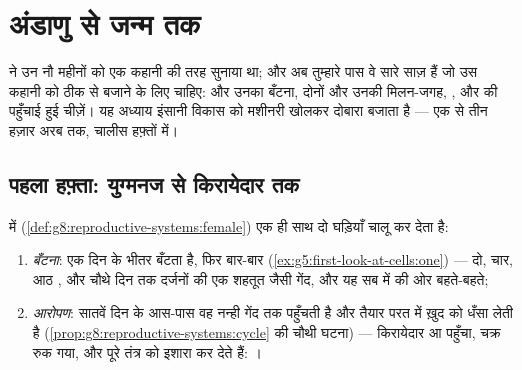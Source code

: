 \chapter{अंडाणु से जन्म तक}\label{ch:g8:from-egg-to-birth}

 ने उन नौ महीनों को एक कहानी की तरह
सुनाया था; और अब तुम्हारे पास वे सारे साज़ हैं जो उस कहानी को ठीक से
बजाने के लिए चाहिए:  और उनका बँटना, दोनों  और उनकी
मिलन-जगह, , और  की पहुँचाई हुई चीज़ें। यह अध्याय इंसानी विकास
को मशीनरी खोलकर दोबारा बजाता है --- एक  से तीन हज़ार अरब तक,
चालीस हफ़्तों में।

\section{पहला हफ़्ता: युग्मनज से किरायेदार तक}

\begin{proposition}[अंडवाहिनी में नीचे का सफ़र]\label{prop:g8:from-egg-to-birth:firstweek}
 में 
(\cref{def:g8:reproductive-systems:female}) एक ही साथ दो घड़ियाँ चालू
कर देता है:
\begin{enumerate}
  \item \emph{बँटना}:  एक दिन के भीतर बँटता है, फिर बार-बार
        (\cref{ex:g5:first-look-at-cells:one}) --- दो, चार, आठ
        , और चौथे दिन तक दर्जनों की एक शहतूत जैसी गेंद, और यह
        सब  में  की ओर बहते-बहते;
  \item \emph{आरोपण}: सातवें दिन के आस-पास वह नन्ही गेंद  तक
        पहुँचती है और तैयार परत में ख़ुद को धँसा लेती है
        (\cref{prop:g8:reproductive-systems:cycle} की चौथी घटना) ---
        किरायेदार आ पहुँचा, चक्र रुक गया, और  पूरे तंत्र को
        इशारा कर देते हैं: ।
\end{enumerate}
\end{proposition}
\admitted

